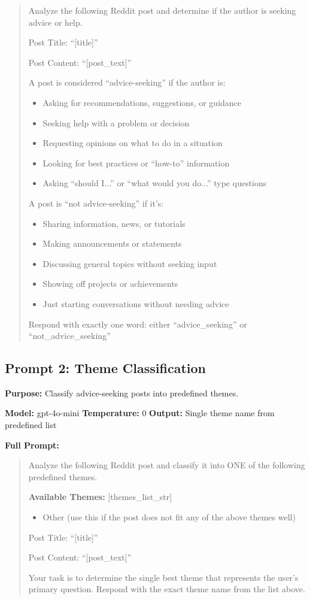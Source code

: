 \begin{quote}
\small
Analyze the following Reddit post and determine if the author is seeking advice or help.

Post Title: ``[title]''

Post Content: ``[post\_text]''

A post is considered ``advice-seeking'' if the author is:
\begin{itemize}
\item Asking for recommendations, suggestions, or guidance
\item Seeking help with a problem or decision
\item Requesting opinions on what to do in a situation
\item Looking for best practices or ``how-to'' information
\item Asking ``should I...'' or ``what would you do...'' type questions
\end{itemize}

A post is ``not advice-seeking'' if it's:
\begin{itemize}
\item Sharing information, news, or tutorials
\item Making announcements or statements
\item Discussing general topics without seeking input
\item Showing off projects or achievements
\item Just starting conversations without needing advice
\end{itemize}

Respond with exactly one word: either ``advice\_seeking'' or ``not\_advice\_seeking''
\end{quote}

\subsection{Prompt 2: Theme Classification}

\textbf{Purpose:} Classify advice-seeking posts into predefined themes.

\textbf{Model:} gpt-4o-mini \quad \textbf{Temperature:} 0 \quad \textbf{Output:} Single theme name from predefined list

\textbf{Full Prompt:}

\begin{quote}
\small
Analyze the following Reddit post and classify it into ONE of the following predefined themes.

\textbf{Available Themes:} [themes\_list\_str]

\begin{itemize}
\item Other (use this if the post does not fit any of the above themes well)
\end{itemize}

Post Title: ``[title]''

Post Content: ``[post\_text]''

Your task is to determine the single best theme that represents the user's primary question. Respond with the exact theme name from the list above.
\end{quote}

